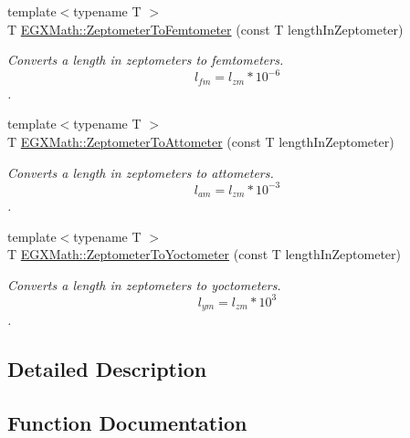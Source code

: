\begin{DoxyCompactItemize}
{\footnotesize template$<$typename T $>$ }\\T \mbox{\hyperlink{group___e_g_x_math-_conversions-_length_conversions-_s_i-_zeptometer-_s_i_ga8975921335cca63259a2c02edfb39c00}{E\+G\+X\+Math\+::\+Zeptometer\+To\+Femtometer}} (const T length\+In\+Zeptometer)
\begin{DoxyCompactList}\small\item\em Converts a length in zeptometers to femtometers. \[ l_{fm}=l_{zm} * 10^{-6} \]. \end{DoxyCompactList}\item 
{\footnotesize template$<$typename T $>$ }\\T \mbox{\hyperlink{group___e_g_x_math-_conversions-_length_conversions-_s_i-_zeptometer-_s_i_ga390ab639bca5b294d985e94d756368c5}{E\+G\+X\+Math\+::\+Zeptometer\+To\+Attometer}} (const T length\+In\+Zeptometer)
\begin{DoxyCompactList}\small\item\em Converts a length in zeptometers to attometers. \[ l_{am}=l_{zm} * 10^{-3} \]. \end{DoxyCompactList}\item 
{\footnotesize template$<$typename T $>$ }\\T \mbox{\hyperlink{group___e_g_x_math-_conversions-_length_conversions-_s_i-_zeptometer-_s_i_ga0477d1a8cb246721ce00cfd7b73d5c9e}{E\+G\+X\+Math\+::\+Zeptometer\+To\+Yoctometer}} (const T length\+In\+Zeptometer)
\begin{DoxyCompactList}\small\item\em Converts a length in zeptometers to yoctometers. \[ l_{ym}=l_{zm} * 10^{3} \]. \end{DoxyCompactList}\end{DoxyCompactItemize}


\subsection{Detailed Description}


\subsection{Function Documentation}
\mbox{\label{group___e_g_x_math-_conversions-_length_conversions-_s_i-_zeptometer-_s_i_ga390ab639bca5b294d985e94d756368c5}} 
